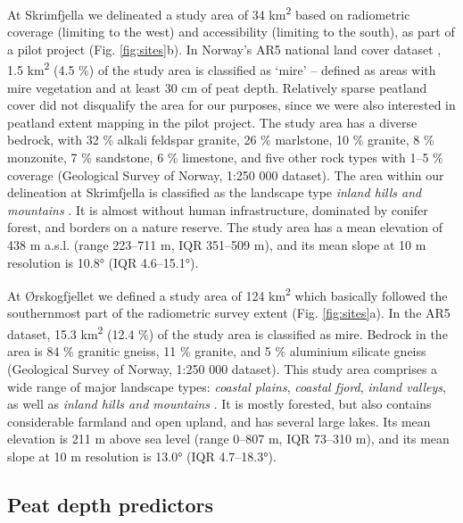 \documentclass[soil, manuscript]{copernicus}
\begin{document}
At Skrimfjella we delineated a study area of 34 km\textsuperscript{2} based on radiometric coverage (limiting to the west) and accessibility (limiting to the south), as part of a pilot project (Fig. \ref{fig:sites}b).
In Norway's AR5 national land cover dataset \citep[``areal resources in scale 1:5000'',][]{ahlstromAR5Klassifikasjonssystem2019}, 1.5 km\textsuperscript{2} (4.5 \%) of the study area is classified as `mire' -- defined as areas with mire vegetation and at least 30 cm of peat depth.
Relatively sparse peatland cover did not disqualify the area for our purposes, since we were also interested in peatland extent mapping in the pilot project.
The study area has a diverse bedrock, with 32 \% alkali feldspar granite, 26 \% marlstone, 10 \% granite, 8 \% monzonite, 7 \% sandstone, 6 \% limestone, and five other rock types with 1--5 \% coverage (Geological Survey of Norway, 1:250 000 dataset).
The area within our delineation at Skrimfjella is classified as the landscape type \emph{inland hills and mountains} \citep{simensenDiversityDistributionLandscape2021}.
It is almost without human infrastructure, dominated by conifer forest, and borders on a nature reserve.
The study area has a mean elevation of 438 m a.s.l. (range 223--711 m, IQR 351--509 m), and its mean slope at 10 m resolution is 10.8° (IQR 4.6--15.1°).

At Ørskogfjellet we defined a study area of 124 km\textsuperscript{2} which basically followed the southernmost part of the radiometric survey extent (Fig. \ref{fig:sites}a).
In the AR5 dataset, 15.3 km\textsuperscript{2} (12.4 \%) of the study area is classified as mire.
Bedrock in the area is 84 \% granitic gneiss, 11 \% granite, and 5 \% aluminium silicate gneiss (Geological Survey of Norway, 1:250 000 dataset).
This study area comprises a wide range of major landscape types: \emph{coastal plains}, \emph{coastal fjord}, \emph{inland valleys}, as well as \emph{inland hills and mountains} \citep{simensenDiversityDistributionLandscape2021}.
It is mostly forested, but also contains considerable farmland and open upland, and has several large lakes.
Its mean elevation is 211 m above sea level (range 0--807 m, IQR 73--310 m), and its mean slope at 10 m resolution is 13.0° (IQR 4.7--18.3°).

\subsection{Peat depth predictors}
\end{document}

